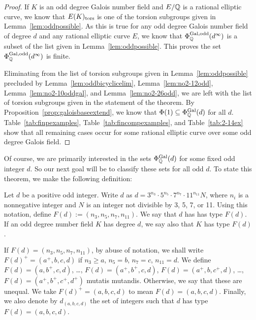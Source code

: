 \begin{proof}
If $K$ is an odd degree Galois number field and $E/\mathbb{Q}$ is a rational elliptic curve, we know that $E(K)_{\text{tors}}$ is one of the torsion subgroups given in Lemma~\ref{lem:oddpossible}. As this is true for any odd degree Galois number field of degree $d$ and any rational elliptic curve $E$, we know that $\Phi_{\mathbb{Q}}^{\operatorname{Gal},\text{odd}}(d^\infty)$ is a subset of the list given in Lemma~\ref{lem:oddpossible}. This proves the set $\Phi_{\mathbb{Q}}^{\operatorname{Gal},\text{odd}}(d^\infty)$ is finite. 

Eliminating from the list of torsion subgroups given in Lemma~\ref{lem:oddpossible} precluded by Lemma~\ref{lem:oddbicyclicelim}, Lemma~\ref{lem:no2-12odd}, Lemma~\ref{lem:no2-10oddgal}, and Lemma~\ref{lem:no2-26odd}, we are left with the list of torsion subgroups given in the statement of the theorem. By Proposition~\ref{prop:galoisbaseextend}, we know that $\Phi(1) \subseteq \Phi_{\mathbb{Q}}^{\operatorname{Gal}}(d)$ for all $d$. Table~\ref{tab:finpexamples}, Table~\ref{tab:fincompexamples}, and Table~\ref{tab:2-14ex} show that all remaining cases occur for some rational elliptic curve over some odd degree Galois field. 
\end{proof}


Of course, we are primarily interested in the sets $\Phi_{\mathbb{Q}}^{\operatorname{Gal}}(d)$ for some fixed odd integer $d$. So our next goal will be to classify these sets for all odd $d$. To state this theorem, we make the following definition:


\begin{dfn}
Let $d$ be a positive odd integer. Write $d$ as $d= 3^{n_3} \cdot 5^{n_5} \cdot 7^{n_7} \cdot 11^{n_{11}}N$, where $n_i$ is a nonnegative integer and $N$ is an integer not divisible by 3, 5, 7, or 11. Using this notation, define $F(d):= (n_3, n_5, n_7, n_{11})$. We say that $d$ has has type $F(d)$. If an odd degree number field $K$ has degree $d$, we say also that $K$ has type $F(d)$. 

If $F(d)= (n_3, n_5, n_7, n_{11})$, by abuse of notation, we shall write $F(d)^+= (a^+,b,c,d)$ if $n_3 \geq a$, $n_5= b$, $n_7= c$, $n_{11}= d$. We define $F(d)= (a,b^+,c,d)$, \dots, $F(d)= (a^+,b^+,c,d)$, $F(d)= (a^+,b,c^+,d)$, \dots, $F(d)= (a^+,b^+,c^+,d^+)$ mutatis mutandis. Otherwise, we say that these are unequal. We take $F(d)^+= (a,b,c,d)$ to mean $F(d)= (a,b,c,d)$. Finally, we also denote by $d_{(a,b,c,d)}$ the set of integers such that $d$ has type $F(d)= (a,b,c,d)$. 
\end{dfn}


